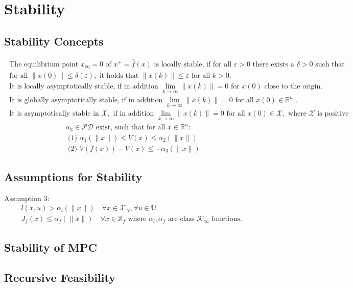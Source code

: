 \documentclass[english]{latex4ei/latex4ei_sheet}
\begin{document}
\section{Stability}
\begin{sectionbox}

\subsection{Stability Concepts}
$$
\begin{array}{l}{\text { The equilibrium point } x_{\mathrm{eq}}=0 \text { of } x^{+}=\hat{f}(x) \text { is locally stable, if for all } \varepsilon>0 \text { there exists a } \delta>0 \text { such that }} \\ {\text { for all }\|x(0)\| \leq \delta(\varepsilon), \text { it holds that }\|x(k)\| \leq \varepsilon \text { for all } k>0 .}\end{array}
$$
$$
\begin{array}{l}{\text { It is locally asymptotically stable, if in addition } \lim _{k \rightarrow \infty}\|x(k)\|=0 \text { for } x(0) \text { close to the origin. }} \\ {\text { It is globally asymptotically stable, if in addition } \lim _{k \rightarrow \infty}\|x(k)\|=0 \text { for all } x(0) \in \mathbb{R}^{n} \text { . }} \\ {\text { It is asymptotically stable in } \mathcal{X}, \text { if in addition } \lim _{k \rightarrow \infty}\|x(k)\|=0 \text { for all } x(0) \in \mathcal{X}, \text { where } \mathcal{X} \text { is positive }}\end{array}
$$
$$
\begin{array}{l}{\alpha_{3} \in \mathcal{P} \mathcal{D} \text { exist, such that for all } x \in \mathbb{R}^{n}:} \\ {\text { (1) } \alpha_{1}(\|x\|) \leq V(x) \leq \alpha_{2}(\|x\|)} \\ {\text { (2) } V(f(x))-V(x) \leq-\alpha_{3}(\|x\|)}\end{array}
$$

\subsection{Assumptions for Stability}
Assumption 3:
$$
\begin{array}{l}{l(x, u)>\alpha_{l}(\|x\|) \quad \forall x \in \mathcal{X}_{N}, \forall u \in \mathbb{U}} \\ {J_{f}(x) \leq \alpha_{f}(\|x\|) \quad \forall x \in \mathbb{X}_{f} \text { where } \alpha_{l}, \alpha_{f} \text { are class } \mathcal{K}_{\infty} \text { functions. }}\end{array}
$$

\subsection{Stability of MPC}

\subsection{Recursive Feasibility}

\end{sectionbox}
\end{document}
